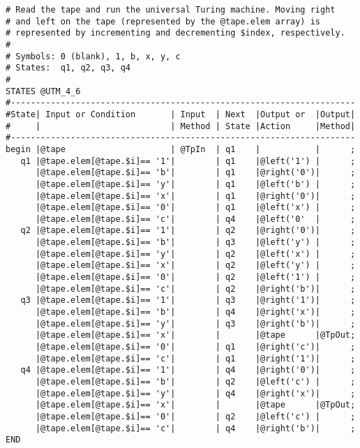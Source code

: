 \begin{lstlisting}[basicstyle=\small,caption={Rogozhin's UTM(4,6) implemented in TEBNF.},label=ExampleUTM46]
# Read the tape and run the universal Turing machine. Moving right
# and left on the tape (represented by the @tape.elem array) is
# represented by incrementing and decrementing $index, respectively.
#
# Symbols: 0 (blank), 1, b, x, y, c
# States:  q1, q2, q3, q4
#
STATES @UTM_4_6
#---------------------------------------------------------------------
#State| Input or Condition       | Input  | Next  |Output or  |Output|
#     |                          | Method | State |Action     |Method|
#---------------------------------------------------------------------
begin |@tape                     | @TpIn  | q1    |           |      ;
   q1 |@tape.elem[@tape.$i]== '1'|        | q1    |@left('1') |      ;
      |@tape.elem[@tape.$i]== 'b'|        | q1    |@right('0')|      ;
      |@tape.elem[@tape.$i]== 'y'|        | q1    |@left('b') |      ;
      |@tape.elem[@tape.$i]== 'x'|        | q1    |@right('0')|      ;
      |@tape.elem[@tape.$i]== '0'|        | q1    |@left('x') |      ;
      |@tape.elem[@tape.$i]== 'c'|        | q4    |@left('0'  |      ;
   q2 |@tape.elem[@tape.$i]== '1'|        | q2    |@right('0')|      ;
      |@tape.elem[@tape.$i]== 'b'|        | q3    |@left('y') |      ;
      |@tape.elem[@tape.$i]== 'y'|        | q2    |@left('x') |      ;
      |@tape.elem[@tape.$i]== 'x'|        | q2    |@left('y') |      ;
      |@tape.elem[@tape.$i]== '0'|        | q2    |@left('1') |      ;
      |@tape.elem[@tape.$i]== 'c'|        | q2    |@right('b')|      ;
   q3 |@tape.elem[@tape.$i]== '1'|        | q3    |@right('1')|      ;
      |@tape.elem[@tape.$i]== 'b'|        | q4    |@right('x')|      ;
      |@tape.elem[@tape.$i]== 'y'|        | q3    |@right('b')|      ;
      |@tape.elem[@tape.$i]== 'x'|        |       |@tape      |@TpOut;
      |@tape.elem[@tape.$i]== '0'|        | q1    |@right('c')|      ;
      |@tape.elem[@tape.$i]== 'c'|        | q1    |@right('1')|      ;
   q4 |@tape.elem[@tape.$i]== '1'|        | q4    |@right('0')|      ;
      |@tape.elem[@tape.$i]== 'b'|        | q2    |@left('c') |      ;
      |@tape.elem[@tape.$i]== 'y'|        | q4    |@right('x')|      ;
      |@tape.elem[@tape.$i]== 'x'|        |       |@tape      |@TpOut;
      |@tape.elem[@tape.$i]== '0'|        | q2    |@left('c') |      ;
      |@tape.elem[@tape.$i]== 'c'|        | q4    |@right('b')|      ;
END
\end{lstlisting}


